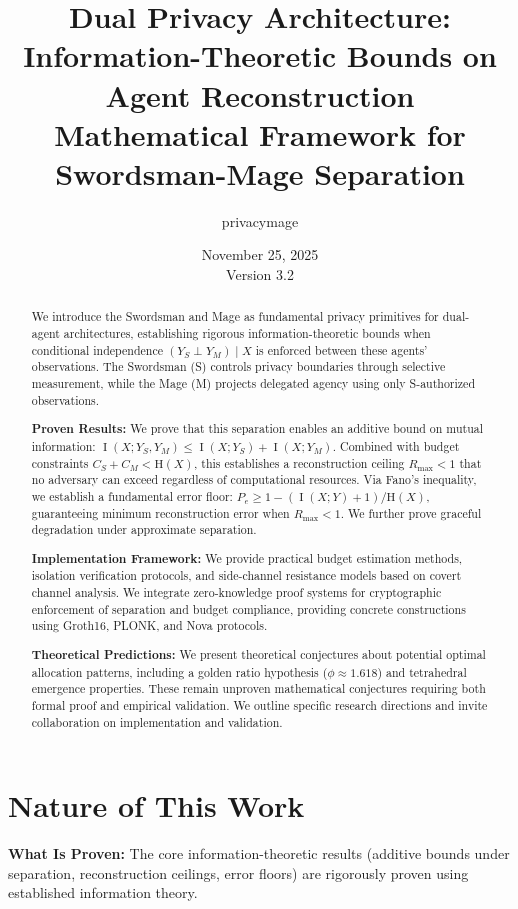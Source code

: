 \documentclass[11pt,a4paper]{article}
\title{Dual Privacy Architecture: Information-Theoretic Bounds on Agent Reconstruction\\
\large Mathematical Framework for Swordsman-Mage Separation}
\author{privacymage}
\date{November 25, 2025\\Version 3.2}
\theoremstyle{definition}
\DeclareMathOperator{\I}{I}
\newcommand{\Entropy}{\mathrm{H}}
\newcommand{\given}{\mid}
\newcommand{\indep}{\perp}
\begin{document}
\maketitle

\begin{abstract}
We introduce the Swordsman and Mage as fundamental privacy primitives for dual-agent architectures, establishing rigorous information-theoretic bounds when conditional independence $(Y_S \indep Y_M) \given X$ is enforced between these agents' observations. The Swordsman (S) controls privacy boundaries through selective measurement, while the Mage (M) projects delegated agency using only S-authorized observations.

\textbf{Proven Results:} We prove that this separation enables an additive bound on mutual information: $\I(X; Y_S, Y_M) \leq \I(X; Y_S) + \I(X; Y_M)$. Combined with budget constraints $C_S + C_M < \Entropy(X)$, this establishes a reconstruction ceiling $R_{\max} < 1$ that no adversary can exceed regardless of computational resources. Via Fano's inequality, we establish a fundamental error floor: $P_e \geq 1 - (\I(X; Y) + 1)/\Entropy(X)$, guaranteeing minimum reconstruction error when $R_{\max} < 1$. We further prove graceful degradation under approximate separation.

\textbf{Implementation Framework:} We provide practical budget estimation methods, isolation verification protocols, and side-channel resistance models based on covert channel analysis. We integrate zero-knowledge proof systems for cryptographic enforcement of separation and budget compliance, providing concrete constructions using Groth16, PLONK, and Nova protocols.

\textbf{Theoretical Predictions:} We present theoretical conjectures about potential optimal allocation patterns, including a golden ratio hypothesis ($\phi \approx 1.618$) and tetrahedral emergence properties. These remain unproven mathematical conjectures requiring both formal proof and empirical validation. We outline specific research directions and invite collaboration on implementation and validation.
\end{abstract}

\section*{Nature of This Work}

\textbf{What Is Proven:} The core information-theoretic results (additive bounds under separation, reconstruction ceilings, error floors) are rigorously proven using established information theory.
\end{document}
